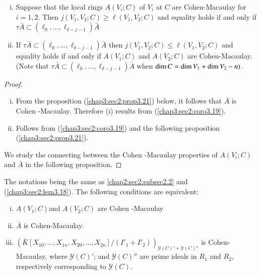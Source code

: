 \begin{corollary}\label{chap3:sec2:coro3.20}
  \begin{enumerate}[(i)] 
  \item  Suppose that the local rings  $A(V_i;C)$  of $V_i$
    at $C$ are Cohen-Macaulay for  $i=
    1,2$. Then $j(V_1,V_2; C) \geq \ell (V_1,V_2;C)$ and
    equality holds if  and only if $\tau \bar{A} \subset (\ell_0,\ldots,\ell
    _{\delta-j-1})\bar{A}$ 

  \item If $\tau \bar{A}\subset (\ell_0, \ldots,\ell
    _{\delta-j-1})\bar{A}$  then $j(V_1,V_2;C) \leq  \ell
    (V_1,V_2;C)$ and equality holds if and only if  $A(V_1;C)
    $ and $A(V_2;C)$ are Cohen-Macaulay. (Note that $\tau \bar{A}\subset
    (\ell_0, \ldots,\ell _{\delta -j-1})\bar{A}$ when $\dim C= \dim\break V_1
    + \dim V_2 - n)$. 
  \end{enumerate}
\end{corollary}

\begin{proof}
  \begin{enumerate}[(i)] 
  \item From the proposition (\ref{chap3:sec2:prop3.21}) below, it follows that $\bar{A}$ is
    Cohen -Macaulay. Therefore (i) results from (\ref{chap3:sec2:coro3.19}). 
  \item Follows from (\ref{chap3:sec2:coro3.19}) and the following
    proposition (\ref{chap3:sec2:prop3.21}). 
  \end{enumerate}
  We study the connecting between the Cohen -Macaulay properties of
  $A(V_i; C)$ and $ \bar{A}$ in the following proposition. 
\end{proof}

\setcounter{proposition}{20}
\begin{proposition}\label{chap3:sec2:prop3.21}
  The notations being the same as \ref{chap2:sec2:subsec2.2} and
  (\ref{chap3:sec2:lem3.18}).  
  The following conditions are equivalent: 
  \begin{enumerate}[(i)]
  \item $ A(V_1;C)$\pageoriginale  and  $ A(V_2;C)$  are Cohen
    -Macaulay  
  \item $\bar{A}$ is Cohen-Macaulay.
  \item $(\bar{K}[X_{10},\ldots,
    X_{1n},X_{20},\ldots,X_{2n}]/(I'_1+I'_2)) _{\mathscr{Y}(C)'+
    \mathscr {Y}(C)''}$  is Cohen-Mac\-aulay, where  $\mathscr
    {Y}(C)'$;  and  $\mathscr{Y}(C)''$ are prime
      ideals in $R_1$ and $R_2$, respectively
      corresponding to  $\mathscr {Y}(C)$. 
\end{enumerate}
\end{proposition}

